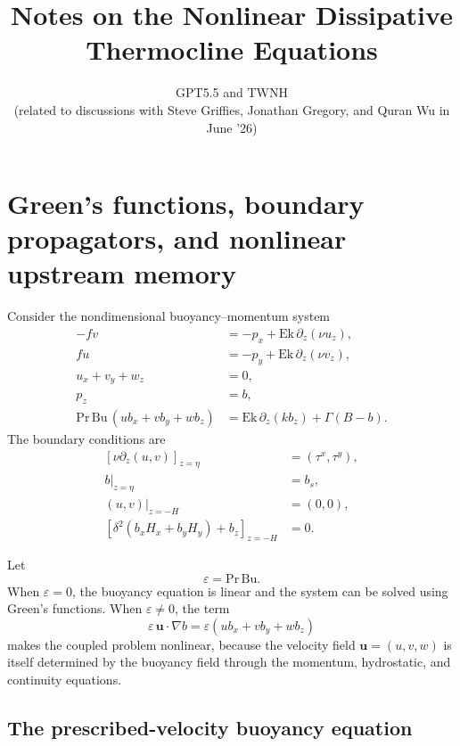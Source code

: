 \documentclass[10pt]{amsart}
\title{Notes on the Nonlinear Dissipative Thermocline Equations}
\author{GPT5.5 and TWNH \\ (related to discussions with Steve Griffies, Jonathan Gregory, and Quran Wu in June '26)}
\date{}                                           %
\begin{document}
\maketitle

\section{Green's functions, boundary propagators, and nonlinear upstream memory}

Consider the nondimensional buoyancy--momentum system
\begin{align}
-fv &= -p_x+\mathrm{Ek}\,\partial_z(\nu u_z), \\
fu &= -p_y+\mathrm{Ek}\,\partial_z(\nu v_z), \\
u_x+v_y+w_z &=0, \\
p_z &= b, \\
\mathrm{Pr}\,\mathrm{Bu}\,(u b_x+v b_y+w b_z)
&=
\mathrm{Ek}\,\partial_z(k b_z)+\Gamma(B-b).
\end{align}
The boundary conditions are
\begin{align}
\left[\nu \partial_z(u,v)\right]_{z=\eta}
&=(\tau^x,\tau^y), \\
b|_{z=\eta} &= b_s, \\
(u,v)|_{z=-H} &=(0,0), \\
\left[
\delta^2(b_x H_x+b_y H_y)+b_z
\right]_{z=-H}&=0.
\end{align}

Let
\[
\varepsilon=\mathrm{Pr}\,\mathrm{Bu}.
\]
When \(\varepsilon=0\), the buoyancy equation is linear and the system can be solved using Green's functions. When \(\varepsilon\neq 0\), the term
\[
\varepsilon\,\mathbf u\cdot\nabla b
=
\varepsilon(u b_x+v b_y+w b_z)
\]
makes the coupled problem nonlinear, because the velocity field \(\mathbf u=(u,v,w)\) is itself determined by the buoyancy field through the momentum, hydrostatic, and continuity equations.

\subsection{The prescribed-velocity buoyancy equation}
\end{document}
